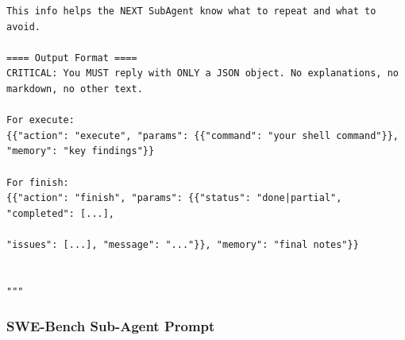 \begin{tcolorbox}[title={\textbf{\small Terminal-Bench Sub-Agent Prompt }},   boxrule=1pt, arc=0mm,colback=black!5!white,colframe=darkgray,breakable, before skip=10pt, after skip=10pt,pad at break=2mm, parbox=false]
\begin{verbatim}
This info helps the NEXT SubAgent know what to repeat and what to avoid.

==== Output Format ====
CRITICAL: You MUST reply with ONLY a JSON object. No explanations, no markdown, no other text.

For execute:
{{"action": "execute", "params": {{"command": "your shell command"}}, "memory": "key findings"}}

For finish:
{{"action": "finish", "params": {{"status": "done|partial", "completed": [...], 

"issues": [...], "message": "..."}}, "memory": "final notes"}}


"""

\end{verbatim}
\end{tcolorbox}


\subsubsection{SWE-Bench Sub-Agent Prompt}
\label{app:B2_swe}

